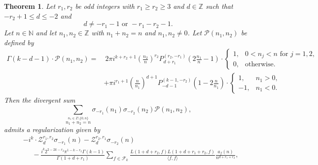 \documentclass[]{article}
\newtheorem{letterthm}{Theorem}
\newcommand{\kf}[1]{{\color{magenta}{#1}}}
\begin{document}
\begin{letterthm}\label{thmB} Let $r_1, r_2$ be odd integers with $r_1 \ge r_2\geq 3$ and $d \in \mathbb{Z}$ such that 
$
    -r_2 + 1 \le d \le -2
$ and 
 \begin{equation}
d\neq -r_1-1 \text{ or } -r_1-r_2-1.     
 \end{equation}
Let $n \in \mathbb{N}$ and 
let $n_1, n_2 \in \mathbb{Z}$ with $n_1+n_2 = n$ and $n_1, n_2 \neq 0$. Let $\mathcal{P}(n_1,n_2)$ be defined by  
\begin{equation}\label{eq:P}
    \begin{split}
  \Gamma(k-d-1) \cdot \mathcal{P}(n_1,n_2)  =& \   2  \pi i^{k+r_2+1}   \left( \frac{n_2}{n}  \right)^{r_2}  P_{d+r_1}^{(r_2,-r_1)}\left(2\tfrac{ n_1}{n}-1\right) \cdot \begin{cases}
    1  , & 0 < n_j < n \text{ for } j=1,2, \\
    0, & \text{otherwise}.
\end{cases}
\\
&  +      \pi i^{ r_1+1 }   \left(\frac{n}{n_1}\right)^{ d+1}   P^{  (k-1, -r_2) }_{-d-1} (1-2 \tfrac{n}{n_1}) \cdot \begin{cases}
    1  , & n_1 > 0, \\
    -1, & n_1 < 0.
\end{cases}
    \end{split}
\end{equation}
 Then   the divergent sum  \begin{equation}
  \sum_{ \stackrel{n_1 \in \mathbb{Z} \setminus \{ 0,n \}}{n_1+n_2=n}  } \sigma_{-r_1}(n_1) \sigma_{-r_2 }(n_2)  \mathcal{P}(n_1, n_2), \end{equation}
admits a regularization given by 
\begin{equation}
\begin{split}
     & -  i^{ k} \cdot  \mathcal{Z}^{r_1,r_2}_d\sigma _{-r_1}(n)    - \mathcal{Z}^{r_2,r_1}_d\sigma_{-r_2}(n) \\
     &  \ \ \ \ \ \  -\frac{i^k 2^{2 - 2 k - r_2} \pi ^{1-k-r_2} \Gamma (k-1) }{\Gamma \left(1+d+r_1\right)} \sum_{f \in \mathcal{F}_k} \frac{L\left(1 + d + r_2,f\right) L\left(1 + d + r_1 + r_2,f\right)}{\langle  f,  f \rangle }   \frac{a_f(n)}{ n^{d+r_1+r_2}}, \\

\end{split}
\end{equation}
\end{letterthm}
\end{document}
